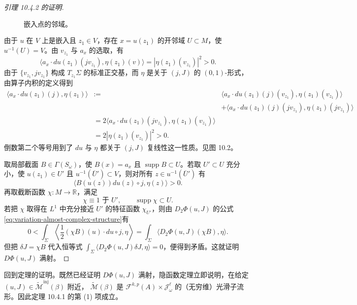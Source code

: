 \begin{proof}[引理 10.4.2 的证明]
\begin{figure}[htbp]
 \centering
 
 \caption{嵌入点的邻域。}
 \label{fig:neighborhood-embedded-point}
\end{figure}

由于 $u$ 在 $V$ 上是嵌入且 $z_1\in V$，存在 $x=u(z_1)$ 的开邻域
$U\subset M$，使 $u^{-1}(U)=V$。由 $v_{z_1}$ 与 $a_x$ 的选取，有
\[
 \bigl\langle a_x\cdot du(z_1)(jv_{z_1}),
 \eta(z_1)(v)\bigr\rangle
 =|\eta(z_1)(v_{z_1})|^2>0.
\]
由于 $\{v_{z_1},jv_{z_1}\}$ 构成 $T_{z_1}\Sigma$ 的标准正交基，而 $\eta$ 是关于
$(j,J)$ 的 $(0,1)$-形式，由算子内积的定义得到
\begin{align*}
 \langle a_x\cdot du(z_1)(j),\eta(z_1)\rangle
 &:={}&\langle a_x\cdot du(z_1)(j)(v_{z_1}),\eta(z_1)(v_{z_1})\rangle\\
 &&+\langle a_x\cdot du(z_1)(j)(jv_{z_1}),\eta(z_1)(jv_{z_1})\rangle\\
 &=2\langle a_x\cdot du(z_1)(jv_{z_1}),\eta(z_1)(v_{z_1})\rangle\\
 &=2|\eta(z_1)(v_{z_1})|^2>0.
\end{align*}
倒数第二个等号用到了 $du$ 与 $\eta$ 都关于 $(j,J)$ 复线性这一性质。见图 10.2。

取局部截面 $B\in\Gamma(S_\omega)$，使 $B(x)=a_x$ 且
$\operatorname{supp}B\subset U$。若取 $U'\subset U$ 充分小，使
$u(z_1)\in U'$ 且 $u^{-1}(\overline U')\subset V$，则对所有
$z\in u^{-1}(\overline U')$ 有
\[
 \langle B(u(z))du(z)\circ j,\eta(z)\rangle>0.
\]
再取截断函数 $\chi:M\to\mathbb R$，满足
\[
 \chi\equiv1\text{ 于 }U',
 \qquad \operatorname{supp}\chi\subset U.
\]
若把 $\chi$ 取得在 $L^1$ 中充分接近 $U'$ 的特征函数 $\chi_{U'}$，则由
$D_2\Phi(u,J)$ 的公式\eqref{eq:variation-almost-complex-structure}有
\[
 0<\int_\Sigma\left\langle\frac12(\chi B)(u)\cdot du\circ j,\eta\right\rangle
 =\int_\Sigma\langle D_2\Phi(u,J)(\chi B),\eta\rangle.
\]
但把 $\delta J=\chi B$ 代入恒等式
$\int_\Sigma\langle D_2\Phi(u,J)\delta J,\eta\rangle=0$，便得到矛盾。这就证明
$D\Phi(u,J)$ 满射。
\end{proof}

回到定理的证明。既然已经证明 $D\Phi(u,J)$ 满射，隐函数定理立即说明，在给定
$(u,J)\in\widetilde{\mathcal M}^{\mathrm{inj}}(\beta)$ 附近，
$\widetilde{\mathcal M}(\beta)$ 是
$\mathcal F^{k,p}(A)\times\mathcal J_\omega^\ell$ 的（无穷维）光滑子流形。因此定理 10.4.1 的第 (1) 项成立。

